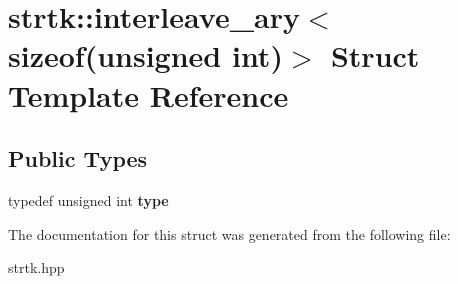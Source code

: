\hypertarget{structstrtk_1_1interleave__ary_3_01sizeof_07unsigned_01int_08_4}{\section{strtk\-:\-:interleave\-\_\-ary$<$ sizeof(unsigned int)$>$ Struct Template Reference}
\label{structstrtk_1_1interleave__ary_3_01sizeof_07unsigned_01int_08_4}
}
\subsection*{Public Types}
\begin{DoxyCompactItemize}
\item 
\hypertarget{structstrtk_1_1interleave__ary_3_01sizeof_07unsigned_01int_08_4_a8767fff05ad99bc68af9a152c15fe035}{typedef unsigned int {\bfseries type}}\label{structstrtk_1_1interleave__ary_3_01sizeof_07unsigned_01int_08_4_a8767fff05ad99bc68af9a152c15fe035}

\end{DoxyCompactItemize}


The documentation for this struct was generated from the following file\-:\begin{DoxyCompactItemize}
\item 
strtk.\-hpp\end{DoxyCompactItemize}
